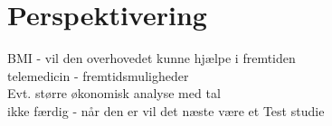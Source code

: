 \chapter{Perspektivering}
BMI - vil den overhovedet kunne hjælpe i fremtiden\\
telemedicin - fremtidsmuligheder \\
Evt. større økonomisk analyse med tal\\
ikke færdig - når den er vil det næste være et Test studie \\

